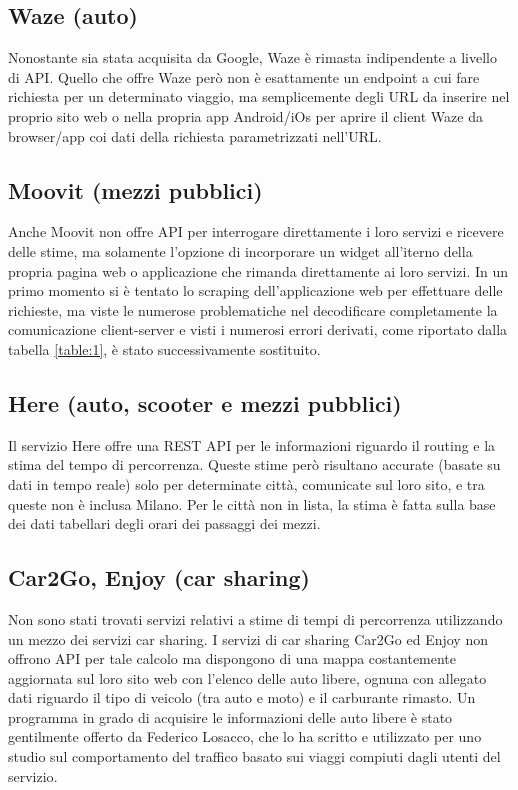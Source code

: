 \subsection{Waze (auto)}

Nonostante sia stata acquisita da Google, Waze è rimasta indipendente a livello di API. Quello che offre Waze però non è esattamente un endpoint a cui fare richiesta per un determinato viaggio, ma semplicemente degli URL da inserire nel proprio sito web o nella propria app Android/iOs per aprire il client Waze da browser/app coi dati della richiesta parametrizzati nell'URL\cite{wazeapi}.

\subsection{Moovit (mezzi pubblici)}

Anche Moovit non offre API per interrogare direttamente i loro servizi e ricevere delle stime, ma solamente l'opzione di incorporare un widget all'iterno della propria pagina web o applicazione che rimanda direttamente ai loro servizi\cite{moovitapi}. In un primo momento si è tentato lo scraping dell'applicazione web per effettuare delle richieste, ma viste le numerose problematiche nel decodificare completamente la comunicazione client-server e visti i numerosi errori derivati, come riportato dalla tabella \ref{table:1}, è stato successivamente sostituito.

\subsection{Here (auto, scooter e mezzi pubblici)}

Il servizio Here offre una REST API per le informazioni riguardo il routing e la stima del tempo di percorrenza. Queste stime però risultano accurate (basate su dati in tempo reale) solo per determinate città, comunicate sul loro sito, e tra queste non è inclusa Milano. Per le città non in lista, la stima è fatta sulla base dei dati tabellari degli orari dei passaggi dei mezzi\cite{hereapi}.

\subsection{Car2Go, Enjoy (car sharing)}

Non sono stati trovati servizi relativi a stime di tempi di percorrenza utilizzando un mezzo dei servizi car sharing. I servizi di car sharing Car2Go ed Enjoy non offrono API per tale calcolo ma dispongono di una mappa costantemente aggiornata sul loro sito web con l'elenco delle auto libere, ognuna con allegato dati riguardo il tipo di veicolo (tra auto e moto) e il carburante rimasto. Un programma in grado di acquisire le informazioni delle auto libere è stato gentilmente offerto da Federico Losacco, che lo ha scritto e utilizzato per uno studio sul comportamento del traffico basato sui viaggi compiuti dagli utenti del servizio\cite{losaccofederico}.

